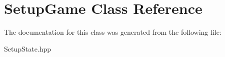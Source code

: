\hypertarget{class_setup_game}{}\section{Setup\+Game Class Reference}
\label{class_setup_game}


The documentation for this class was generated from the following file\+:\begin{DoxyCompactItemize}
\item 
Setup\+State.\+hpp\end{DoxyCompactItemize}
